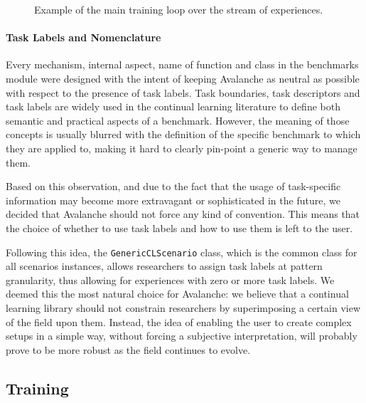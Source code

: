 \documentclass[final]{cvpr}
\theoremstyle{definition}
\newcommand{\codeinline}[1]{\texttt{#1}}
\begin{document}
\begin{figure}[ht]
\begin{tcolorbox}[title={Main Training Loop}, colback=mygray]
\inputminted{python}{scenario_loop.py}
\end{tcolorbox}
\caption{Example of the main training loop over the stream of experiences.}
\label{code:train-loop}
\end{figure}

\paragraph{Task Labels and Nomenclature}

Every mechanism, internal aspect, name of function and class in the benchmarks module were designed with the intent of keeping Avalanche as neutral as possible with respect to the presence of task labels. Task boundaries, task descriptors and task labels are widely used in the continual learning literature to define both semantic and practical aspects of a benchmark. However, the meaning of those concepts is usually blurred with the definition of the specific benchmark to which they are applied to, making it hard to clearly pin-point a generic way to manage them.

Based on this observation, and due to the fact that the usage of task-specific information may become more extravagant or sophisticated in the future, we decided that Avalanche should not force any kind of convention. This means that the choice of whether to use task labels and how to use them is left to the user.

Following this idea, the \codeinline{GenericCLScenario} class, which is the common class for all scenarios instances, allows researchers to assign task labels at pattern granularity, thus allowing for experiences with zero or more task labels. We deemed this the most natural choice for Avalanche: we believe that a continual learning library should not constrain researchers by superimposing a certain view of the field upon them. %
Instead, the idea of enabling the user to create complex setups in a simple way, without forcing a subjective interpretation, will probably prove to be more robust as the field continues to evolve.

\subsection{Training}
\label{sec:training}
\end{document}
